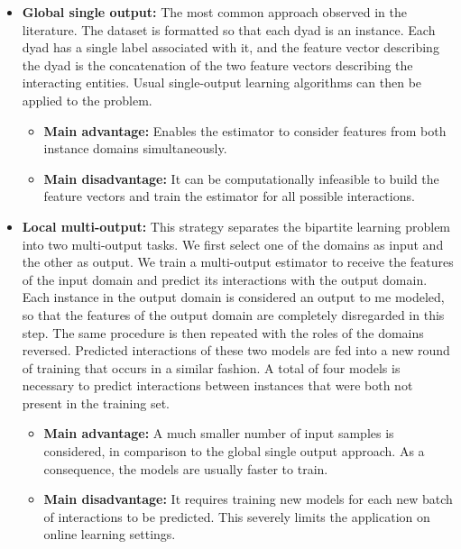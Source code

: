 \begin{itemize}
    \item \textbf{Global single output:} The most common approach observed in the literature. The dataset is formatted so that each dyad is an instance. Each dyad has a single label associated with it, and the feature vector describing the dyad is the concatenation of the two feature vectors describing the interacting entities.
    Usual single-output learning algorithms can then be applied to the problem.
    \begin{itemize}
        \item \textbf{Main advantage:} Enables the estimator to consider features from both instance domains simultaneously.
        \item \textbf{Main disadvantage:} It can be computationally infeasible to build the feature vectors and train the estimator for all possible interactions.
    \end{itemize}
    \item \textbf{Local multi-output:} This strategy separates the bipartite learning problem into two multi-output tasks.
    We first select one of the domains as input and the other as output. We train a multi-output estimator to receive the features of the input domain and predict its interactions with the output domain. Each instance in the output domain is considered an output to me modeled, so that the features of the output domain are completely disregarded in this step.
    The same procedure is then repeated with the roles of the domains reversed. Predicted interactions of these two models are fed into a new round of training that occurs in a similar fashion. A total of four models is necessary to predict interactions between instances that were both not present in the training set.
    \begin{itemize}
        \item \textbf{Main advantage:} A much smaller number of input samples is considered, in comparison to the global single output approach. As a consequence, the models are usually faster to train.
        \item \textbf{Main disadvantage:} It requires training new models for each new batch of interactions to be predicted. This severely limits the application on online learning settings.
    \end{itemize}
\end{itemize}

